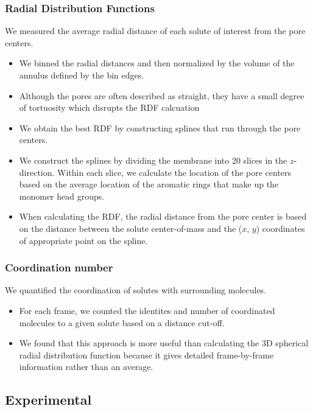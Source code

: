 \documentclass{article}
\begin{document}
  \subsubsection*{Radial Distribution Functions}

  We measured the average radial distance of each solute of interest from the pore
  centers.
  \begin{itemize}
	\item We binned the radial distances and then normalized by the volume
	of the annulus defined by the bin edges.
	\item Although the pores are often described as straight, they have a
	small degree of tortuosity which disrupts the RDF calcuation 
	\item We obtain the best RDF by constructing splines that run through the
	pore centers.
	\item We construct the splines by dividing the membrane into 20 slices
	in the $z$-direction. Within each slice, we calculate the location of 
	the pore centers based on the average location of the aromatic rings
	that make up the monomer head groups.
	\item When calculating the RDF, the radial distance from the pore center
	is based on the distance between the solute center-of-mass and the ($x$, $y$)
	coordinates of appropriate point on the spline.
  \end{itemize}

  \subsubsection*{Coordination number}

  We quantified the coordination of solutes with surrounding molecules.
  \begin{itemize}
  	\item For each frame, we counted the identites and number of
  	coordinated molecules to a given solute based on a distance cut-off. 
	\item We found that this approach is more useful than calculating the
	3D spherical radial distribution function because it gives detailed
	frame-by-frame information rather than an average. 
  \end{itemize}

  \subsection{Experimental}
   
\end{document}
